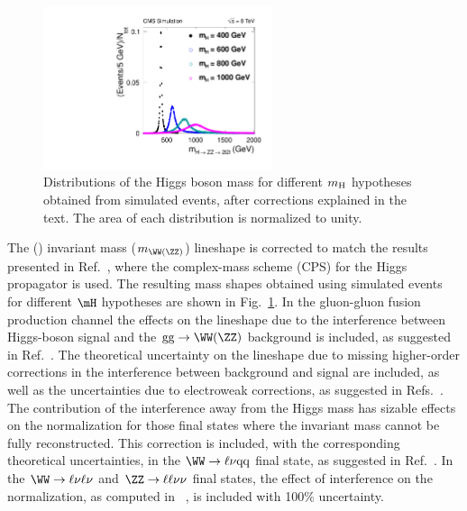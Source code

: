 \begin{figure}[htbp]
\centering
   \includegraphics[width=0.6\textwidth]{figures/HiggsMasses.pdf}
   \caption{Distributions of the Higgs boson mass for different $m_{\rm{H}}$
    hypotheses obtained from simulated events, after corrections explained in the text.
    The area of each distribution is normalized to unity.
   }
\label{fig:higgsmasses}
\end{figure}

The \WW(\ZZ) invariant mass ($m_{\WW(\ZZ)}$) lineshape is corrected to match the results
presented in Ref.~\cite{Passarino:2010qk,Goria:2011wa,Kauer:2012hd},
where the complex-mass scheme (CPS) for the Higgs propagator is used.
The resulting mass shapes obtained using simulated events
 for different $\mH$ hypotheses are shown in Fig.~\ref{fig:higgsmasses}.
In the gluon-gluon fusion production channel the effects on the
lineshape due to the interference between Higgs-boson signal and the 
$\mathrm{gg} \to \WW(\ZZ)$
background is included, as suggested in Ref.~\cite{Passarino:2012ri}.
The theoretical uncertainty on the lineshape 
due to missing higher-order corrections
in the interference between background and signal are included, 
as well as the uncertainties due to electroweak
corrections, as suggested in Refs.~\cite{Goria:2011wa,Passarino:2012ri}.
The contribution of the interference away from the Higgs mass 
has sizable effects on the normalization for those final states where the 
invariant mass
cannot be fully reconstructed. This correction is included, with the corresponding
theoretical uncertainties, 
in the $\WW \to \ell \nu \rm{qq}$ final state, as suggested in Ref.~\cite{Passarino:2012ri}.
In the $\WW \to \ell\nu\ell\nu$ and $\ZZ \to \ell \ell \nu\nu$ final states, 
the effect of interference on 
the normalization,
as computed in ~\cite{Campbell:2011cu,Kauer:2012ma,MaltoniInPrep},
is included with 100\% uncertainty.





